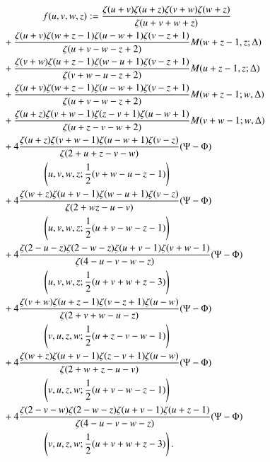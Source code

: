 \begin{align}
& \qquad \qquad f(u,v,w,z) : = \frac{\zeta(u+v) \zeta(u+z) \zeta(v+w)
    \zeta(w+z)}{\zeta(u+v+w+z)}\label{c5:eq5.111}\\ 
& + \frac{\zeta(u+v) \zeta (w+z-1) \zeta(u-w+1) \zeta (v-z+1)}{
    \zeta(u+v-w-z+2)} M(w+z-1,  z ;\Delta)\notag\\ 
& +  \frac{\zeta(v+w) \zeta (u+z-1) \zeta (w-u+1)
    \zeta(v-z+1)}{\zeta(v+w-u-z+2)} M (u+z-1, z ;\Delta)\notag\\ 
& + \frac{\zeta(u+v) \zeta (w+z-1) \zeta (u-w+1)
    \zeta(v-z+1)}{\zeta(u+v-w-z+2)} M (w+z-1;w,\Delta)\notag\\ 
& + \frac{\zeta(u+z) \zeta (v+w-1) \zeta (z-v+1) \zeta (u-w+1)}{
    \zeta(u+z-v-w+2)} M (v+w-1; w,\Delta)\notag\\ 
& + 4 \frac{\zeta (u+z) \zeta (v+w-1) \zeta(u-w+1)
    \zeta(v-z)}{\zeta(2+u+z-v-w)} (\Psi -\Phi)\notag\\ 
& \qquad \qquad  \left(u,v,w,z;\frac{1}{2} (v+w-u-z-1) \right)\notag\\
& + 4 \frac{\zeta(w+z) \zeta(u+v-1) \zeta(w-u+1)
    \zeta(v-z)}{\zeta(2+wz-u-v)} (\Psi -\Phi)\notag\\ 
& \qquad \qquad \left(u,v,w,z;\frac{1}{2} (u+v-w-z-1) \right)\notag\\
& + 4 \frac{\zeta(2-u-z) \zeta(2-w-z) \zeta (u+v-1) \zeta
    (v+w-1)}{\zeta(4-u-v-w-z)} (\Psi - \Phi)\notag\\ 
& \qquad \qquad  \left(u,v,w,z;\frac{1}{2} (u+v+w+z-3) \right)\notag\\
& + 4 \frac{\zeta(v+w) \zeta (u+z-1) \zeta(v-z+1)
    \zeta(u-w)}{\zeta(2+v+w-u-z)} (\Psi-\Phi)\notag\\ 
& \qquad \qquad \left(v,u,z,w;\frac{1}{2} (u+z-v-w-1) \right)\notag\\ 
& + 4 \frac{\zeta (w+z) \zeta (u+v-1) \zeta (z-v+1) \zeta
    (u-w)}{\zeta(2+w+z-u-v)} (\Psi-\Phi)\notag\\ 
& \qquad \qquad \left(v,u,z,w;\frac{1}{2} (u+v-w-z-1)\right)\notag\\
& + 4 \frac{\zeta(2-v-w) \zeta(2-w-z) \zeta (u+v-1)
    \zeta(u+z-1)}{\zeta(4-u-v-w-z)} (\Psi - \Phi)\notag\\ 
& \qquad \qquad  \left(v,u,z,w;\frac{1}{2} (u+v+w+z-3) \right).\notag
\end{align}\pageoriginale

